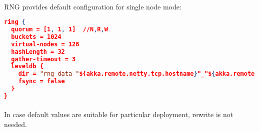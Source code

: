 \paragraph{}
RNG provides default configuration for single node mode:

\begin{lstlisting}[language=json,caption=Example]
ring {
  quorum = [1, 1, 1]  //N,R,W
  buckets = 1024
  virtual-nodes = 128
  hashLength = 32
  gather-timeout = 3
  leveldb {
    dir = "rng_data_"${akka.remote.netty.tcp.hostname}"_"${akka.remote.netty.tcp.port}
    fsync = false
  }
}
\end{lstlisting}

\paragraph{}
In case default values are suitable for particular deployment, rewrite is not needed.

